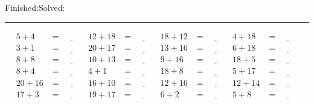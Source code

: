 \documentclass{article}
\begin{document}
\begin{sloppy}
\begin{center}
{\selectfont {Started:}\underline{\hspace{1.5cm}}{Finished:}\underline{\hspace{1.5cm}}{Solved:}\underline{\hspace{1.5cm}}}
\end{center}
\hrule
\begin{align*}
    {5} + {4} &= \underline{\hspace{1cm}} & {12} + {18} &= \underline{\hspace{1cm}} & {18} + {12} &= \underline{\hspace{1cm}} & {4} + {18} &= \underline{\hspace{1cm}} \\
    {3} + {1} &= \underline{\hspace{1cm}} & {20} + {17} &= \underline{\hspace{1cm}} & {13} + {16} &= \underline{\hspace{1cm}} & {6} + {18} &= \underline{\hspace{1cm}} \\
    {8} + {8} &= \underline{\hspace{1cm}} & {10} + {13} &= \underline{\hspace{1cm}} & {9} + {16} &= \underline{\hspace{1cm}} & {18} + {5} &= \underline{\hspace{1cm}} \\
    {8} + {4} &= \underline{\hspace{1cm}} & {4} + {1} &= \underline{\hspace{1cm}} & {18} + {8} &= \underline{\hspace{1cm}} & {5} + {17} &= \underline{\hspace{1cm}} \\
    {20} + {16} &= \underline{\hspace{1cm}} & {16} + {10} &= \underline{\hspace{1cm}} & {12} + {16} &= \underline{\hspace{1cm}} & {12} + {14} &= \underline{\hspace{1cm}} \\
    {17} + {3} &= \underline{\hspace{1cm}} & {19} + {17} &= \underline{\hspace{1cm}} & {6} + {2} &= \underline{\hspace{1cm}} & {5} + {8} &= \underline{\hspace{1cm}} \\

\end{align*}
\end{sloppy}
\end{document}
